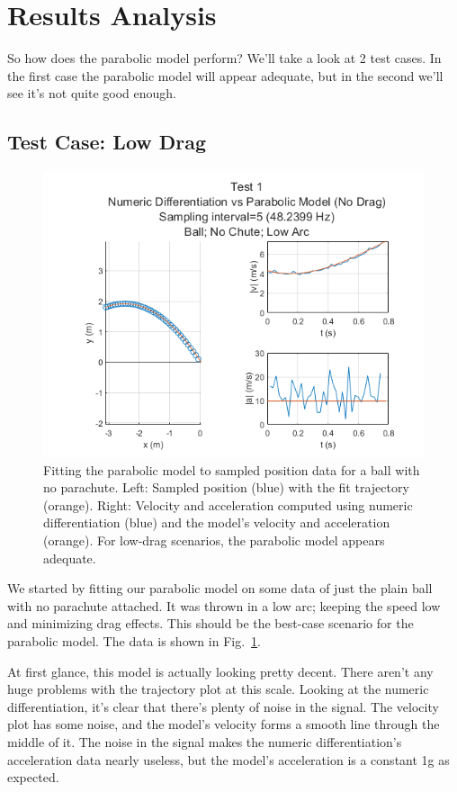\section{Results Analysis}

So how does the parabolic model perform? We'll take a look at 2 test cases. In the first case the parabolic model will appear adequate, but in the second we'll see it's not quite good enough.

\subsection{Test Case: Low Drag}


\begin{figure}[t]
\centering
\includegraphics[width=0.9\linewidth]{images/Analysis1_Test1_Fig5_NoDrag.png}
\caption{\label{fig:Analysis1_Test1_Fig5_NoDrag} Fitting the parabolic model to sampled position data for a ball with no parachute. Left: Sampled position (blue) with the fit trajectory (orange). Right: Velocity and acceleration computed using numeric differentiation (blue) and the model's velocity and acceleration (orange). For low-drag scenarios, the parabolic model appears adequate.}
\end{figure}

We started by fitting our parabolic model on some data of just the plain ball with no parachute attached. It was thrown in a low arc; keeping the speed low and minimizing drag effects. This should be the best-case scenario for the parabolic model. The data is shown in Fig.~\ref{fig:Analysis1_Test1_Fig5_NoDrag}. 

At first glance, this model is actually looking pretty decent. There aren't any huge problems with the trajectory plot at this scale. Looking at the numeric differentiation, it's clear that there's plenty of noise in the signal. The velocity plot has some noise, and the model's velocity forms a smooth line through the middle of it. The noise in the signal makes the numeric differentiation's acceleration data nearly useless, but the model's acceleration is a constant 1g as expected. 

